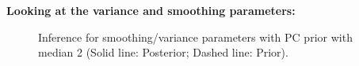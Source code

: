 \documentclass{beamer} %
\begin{document}
\begin{frame}
\textbf{Looking at the variance and smoothing parameters:}
\begin{figure}[p]
    \centering
     \caption{\fontsize{8}{11}\selectfont Inference for smoothing/variance parameters with PC prior \citep{simpson2017penalising} with median 2 (Solid line: Posterior; Dashed line: Prior).}
    \label{fig:realdata_1990_2}
\end{figure}
\end{frame}
\end{document}

